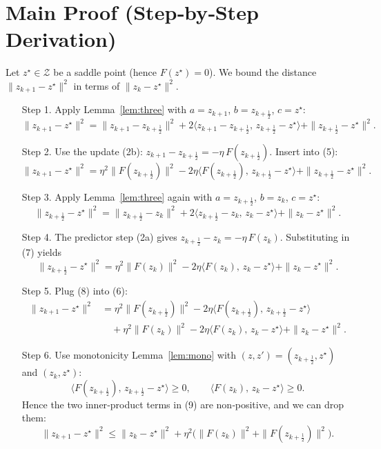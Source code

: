\documentclass{article}
\begin{document}
\section*{Main Proof (Step‑by‑Step Derivation)}
Let $z^{\star}\in\mathcal Z$ be a saddle point (hence $F(z^{\star})=0$).  
We bound the distance $\|z_{k+1}-z^{\star}\|^{2}$ in terms of $\|z_{k}-z^{\star}\|^{2}$.

\begin{enumerate}
\item[Step 1.] Apply Lemma~\ref{lem:three} with $a=z_{k+1}$, $b=z_{k+\frac12}$,
$c=z^{\star}$:
\[
\|z_{k+1}-z^{\star}\|^{2}
   =\|z_{k+1}-z_{k+\frac12}\|^{2}
    +2\langle z_{k+1}-z_{k+\frac12},\,z_{k+\frac12}-z^{\star}\rangle
    +\|z_{k+\frac12}-z^{\star}\|^{2}. \tag{5}
\]

\item[Step 2.] Use the update (2b): $z_{k+1}-z_{k+\frac12}= -\eta\,
F(z_{k+\frac12})$.
Insert into (5):
\[
\|z_{k+1}-z^{\star}\|^{2}
   =\eta^{2}\|F(z_{k+\frac12})\|^{2}
    -2\eta\langle F(z_{k+\frac12}),\,z_{k+\frac12}-z^{\star}\rangle
    +\|z_{k+\frac12}-z^{\star}\|^{2}. \tag{6}
\]

\item[Step 3.] Apply Lemma~\ref{lem:three} again with $a=z_{k+\frac12}$,
$b=z_{k}$, $c=z^{\star}$:
\[
\|z_{k+\frac12}-z^{\star}\|^{2}
   =\|z_{k+\frac12}-z_{k}\|^{2}
    +2\langle z_{k+\frac12}-z_{k},\,z_{k}-z^{\star}\rangle
    +\|z_{k}-z^{\star}\|^{2}. \tag{7}
\]

\item[Step 4.] The predictor step (2a) gives $z_{k+\frac12}-z_{k}= -\eta\,F(z_{k})$.
Substituting in (7) yields
\[
\|z_{k+\frac12}-z^{\star}\|^{2}
   =\eta^{2}\|F(z_{k})\|^{2}
    -2\eta\langle F(z_{k}),\,z_{k}-z^{\star}\rangle
    +\|z_{k}-z^{\star}\|^{2}. \tag{8}
\]

\item[Step 5.] Plug (8) into (6):
\[
\begin{aligned}
\|z_{k+1}-z^{\star}\|^{2}
   &=\eta^{2}\|F(z_{k+\frac12})\|^{2}
    -2\eta\langle F(z_{k+\frac12}),\,z_{k+\frac12}-z^{\star}\rangle  \\
   &\quad +\eta^{2}\|F(z_{k})\|^{2}
    -2\eta\langle F(z_{k}),\,z_{k}-z^{\star}\rangle
    +\|z_{k}-z^{\star}\|^{2}. \tag{9}
\end{aligned}
\]

\item[Step 6.] Use monotonicity Lemma~\ref{lem:mono} with $(z,z')=(z_{k+\frac12},z^{\star})$ and $(z_{k},z^{\star})$:
\[
\langle F(z_{k+\frac12}),\,z_{k+\frac12}-z^{\star}\rangle\ge0,\qquad
\langle F(z_{k}),\,z_{k}-z^{\star}\rangle\ge0. \tag{10}
\]
Hence the two inner‑product terms in (9) are non‑positive, and we can drop them:
\[
\|z_{k+1}-z^{\star}\|^{2}
   \le\|z_{k}-z^{\star}\|^{2}
    +\eta^{2}\bigl(\|F(z_{k})\|^{2}+\|F(z_{k+\frac12})\|^{2}\bigr). \tag{11}
\]


\end{enumerate}
\end{document}
